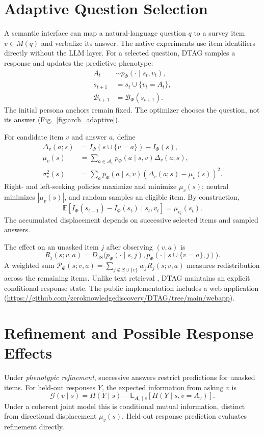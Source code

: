 \documentclass[technote,10pt]{IEEEtran}
\newcommand{\EE}{\mathbb{E}}
\newcommand{\calB}{\mathcal{B}}
\newcommand{\JS}{D_{\mathrm{JS}}}
\newcommand{\Ph}{\Phi}
\begin{document}
\section{Adaptive Question Selection}
A semantic interface can map a natural-language question $q$ to a survey item $v\in M(q)$ and verbalize its answer. The native experiments use item identifiers directly without the LLM layer. For a selected question, DTAG samples a response and updates the predictive phenotype:
\begin{align}
A_t&\sim p_\Ph(\cdot\mid s_t,v_t),\label{eq:draw}\\
s_{t+1}&=s_t\cup\{v_t=A_t\},\label{eq:update}\\
\calB_{t+1}&=\calB_\Ph(s_{t+1}).\label{eq:posterior}
\end{align}
The initial persona anchors remain fixed. The optimizer chooses the question, not its answer (Fig.~\ref{fig:arch_adaptive}).

For candidate item $v$ and answer $a$, define
\begin{align}
\Delta_v(a;s)&=I_\Ph(s\cup\{v=a\})-I_\Ph(s),\label{eq:delta}\\
\mu_v(s)&=\sum_{a\in\mathcal A_v}p_\Ph(a\mid s,v)\Delta_v(a;s),\label{eq:mu}\\
\sigma_v^2(s)&=\sum_a p_\Ph(a\mid s,v)(\Delta_v(a;s)-\mu_v(s))^2.
\label{eq:var}
\end{align}
Right- and left-seeking policies maximize and minimize $\mu_v(s)$; neutral minimizes $|\mu_v(s)|$, and random samples an eligible item. By construction,
\begin{equation*}
\EE[I_\Ph(s_{t+1})-I_\Ph(s_t)\mid s_t,v_t]=\mu_{v_t}(s_t).
\end{equation*}
The accumulated displacement depends on successive selected items and sampled answers.

The effect on an unasked item $j$ after observing $(v,a)$ is
\begin{equation}
R_j(s;v,a)=\JS\!\bigl(p_\Ph(\cdot\mid s,j),
p_\Ph(\cdot\mid s\cup\{v=a\},j)\bigr).
\label{eq:ripple}
\end{equation}
A weighted sum $\mathcal P_\Ph(s;v,a)=\sum_{j\notin S\cup\{v\}}w_jR_j(s;v,a)$ measures redistribution across the remaining items. Unlike text retrieval \cite{lewis2020}, DTAG maintains an explicit conditional response state. The public implementation includes a web application (\url{https://github.com/zeroknowledgediscovery/DTAG/tree/main/webapp}).

\section{Refinement and Possible Response Effects}
Under \emph{phenotypic refinement}, successive answers restrict predictions for unasked items. For held-out responses $Y$, the expected information from asking $v$ is
\begin{equation}
\mathcal G(v\mid s)=
H(Y\mid s)-\EE_{A_v\mid s}[H(Y\mid s,v=A_v)].
\label{eq:ig}
\end{equation}
Under a coherent joint model this is conditional mutual information, distinct from directional displacement $\mu_v(s)$. Held-out response prediction evaluates refinement directly.
\end{document}
